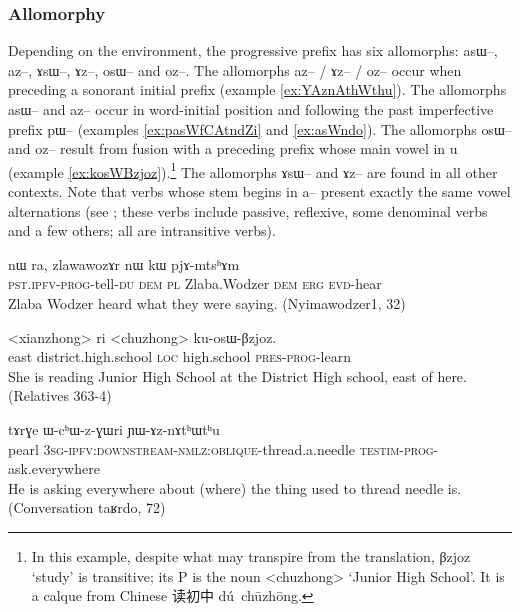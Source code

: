 \documentclass[oldfontcommands,oneside,a4paper,11pt]{article}
\newcommand{\ipa}[1]{{\phon \mbox{#1}}} %
\newcommand{\zh}[1]{{\cn #1}}
\begin{document}
\subsubsection{Allomorphy} \label{sec:prog.allomorphy}
Depending on the environment, the progressive prefix has six allomorphs: \ipa{asɯ--}, \ipa{az--}, \ipa{ɤsɯ--}, \ipa{ɤz--}, \ipa{osɯ--} and \ipa{oz--}. The allomorphs   \ipa{az--} / \ipa{ɤz--} / \ipa{oz--} occur when preceding a sonorant initial prefix (example \ref{ex:YAznAthWthu}). The allomorphs \ipa{asɯ--} and \ipa{az--} occur in word-initial position and following the past imperfective prefix \ipa{pɯ--} (examples \ref{ex:pasWfCAtndZi} and \ref{ex:asWndo}). The allomorphs \ipa{osɯ--} and \ipa{oz--} result from fusion with a preceding prefix whose main vowel in \ipa{u} (example \ref{ex:kosWBzjoz}).\footnote{In this example, despite what may transpire from the translation, \ipa{βzjoz} `study' is transitive; its P is the noun <chuzhong> `Junior High School'. It is a calque from Chinese \zh{读初中} \ipa{dú chūzhōng}.} The allomorphs \ipa{ɤsɯ--} and \ipa{ɤz--} are found in all other contexts. Note that verbs whose stem begins in \ipa{a--} present exactly the same vowel alternations (see \citealt{jacques07passif}; these verbs include passive, reflexive, some denominal verbs and a few others; all are intransitive verbs).


\begin{exe}
\ex \label{ex:pasWfCAtndZi}
\gll \ipa{pɯ-asɯ-fɕɤt-ndʑi} 	\ipa{nɯ} 	\ipa{ra,} 	\ipa{zlawawozɤr} 	\ipa{nɯ} 	\ipa{kɯ} 	\ipa{pjɤ-mtsʰɤm}\\
\textsc{pst.ipfv-prog}-tell-\textsc{du} \textsc{dem} \textsc{pl}  Zlaba.Wodzer \textsc{dem} \textsc{erg} \textsc{evd}-hear\\
\glt Zlaba Wodzer heard what they were saying. (Nyimawodzer1, 32)
\end{exe}

\begin{exe}
\ex \label{ex:kosWBzjoz}
\gll \ipa{akɯ} <xianzhong> \ipa{ri} <chuzhong> \ipa{ku-osɯ-βzjoz}. \\
east district.high.school \textsc{loc} high.school \textsc{pres-prog}-learn \\
\glt She is reading Junior High School at the District High school, east of here. (Relatives 363-4)
\end{exe}

 \begin{exe}
\ex \label{ex:YAznAthWthu}
\gll
\ipa{tɤrɣe}  	\ipa{ɯ-cʰɯ-z-ɣɯri}  	\ipa{ɲɯ-ɤz-nɤtʰɯtʰu}  	 \\
pearl \textsc{3sg-ipfv:downstream-nmlz:oblique}-thread.a.needle \textsc{testim-prog}-ask.everywhere \\
\glt He is asking everywhere about (where) the thing used to thread needle is. (Conversation \ipa{taʁrdo}, 72)
\end{exe}
\end{document}
